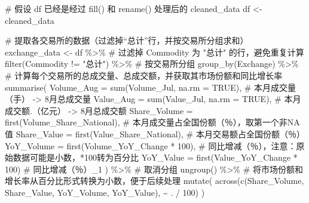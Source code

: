 \documentclass[
  letterpaper,
  DIV=11,
  numbers=noendperiod]{scrartcl}
\newenvironment{Shaded}{\begin{snugshade}}{\end{snugshade}}
\newcommand{\AttributeTok}[1]{\textcolor[rgb]{0.40,0.45,0.13}{#1}}
\newcommand{\CommentTok}[1]{\textcolor[rgb]{0.37,0.37,0.37}{#1}}
\newcommand{\ConstantTok}[1]{\textcolor[rgb]{0.56,0.35,0.01}{#1}}
\newcommand{\DecValTok}[1]{\textcolor[rgb]{0.68,0.00,0.00}{#1}}
\newcommand{\FunctionTok}[1]{\textcolor[rgb]{0.28,0.35,0.67}{#1}}
\newcommand{\NormalTok}[1]{\textcolor[rgb]{0.00,0.23,0.31}{#1}}
\newcommand{\OtherTok}[1]{\textcolor[rgb]{0.00,0.23,0.31}{#1}}
\newcommand{\SpecialCharTok}[1]{\textcolor[rgb]{0.37,0.37,0.37}{#1}}
\newcommand{\StringTok}[1]{\textcolor[rgb]{0.13,0.47,0.30}{#1}}
\begin{document}
\begin{Shaded}
\begin{Highlighting}[]
\CommentTok{\# 假设 df 已经是经过 fill() 和 rename() 处理后的 cleaned\_data}
\NormalTok{df }\OtherTok{\textless{}{-}}\NormalTok{ cleaned\_data}

\CommentTok{\# 提取各交易所的数据（过滤掉“总计”行，并按交易所分组求和）}
\NormalTok{exchange\_data }\OtherTok{\textless{}{-}}\NormalTok{ df }\SpecialCharTok{\%\textgreater{}\%}
  \CommentTok{\# 过滤掉 Commodity 为 "总计" 的行，避免重复计算}
  \FunctionTok{filter}\NormalTok{(Commodity }\SpecialCharTok{!=} \StringTok{"总计"}\NormalTok{) }\SpecialCharTok{\%\textgreater{}\%}
  \CommentTok{\# 按交易所分组}
  \FunctionTok{group\_by}\NormalTok{(Exchange) }\SpecialCharTok{\%\textgreater{}\%}
  \CommentTok{\# 计算每个交易所的总成交量、总成交额，并获取其市场份额和同比增长率}
  \FunctionTok{summarise}\NormalTok{(}
    \AttributeTok{Volume\_Aug =} \FunctionTok{sum}\NormalTok{(Volume\_Jul, }\AttributeTok{na.rm =} \ConstantTok{TRUE}\NormalTok{),           }\CommentTok{\# 本月成交量（手） {-}\textgreater{} 8月总成交量}
    \AttributeTok{Value\_Aug =} \FunctionTok{sum}\NormalTok{(Value\_Jul, }\AttributeTok{na.rm =} \ConstantTok{TRUE}\NormalTok{),             }\CommentTok{\# 本月成交额.（亿元） {-}\textgreater{} 8月总成交额}
    \AttributeTok{Share\_Volume =} \FunctionTok{first}\NormalTok{(Volume\_Share\_National),          }\CommentTok{\# 本月成交量占全国份额（％），取第一个非NA值}
    \AttributeTok{Share\_Value =} \FunctionTok{first}\NormalTok{(Value\_Share\_National),            }\CommentTok{\# 本月交易额占全国份额（％）}
    \AttributeTok{YoY\_Volume =} \FunctionTok{first}\NormalTok{(Volume\_YoY\_Change }\SpecialCharTok{*} \DecValTok{100}\NormalTok{),          }\CommentTok{\# 同比增减（％），注意：原始数据可能是小数，*100转为百分比}
    \AttributeTok{YoY\_Value =} \FunctionTok{first}\NormalTok{(Value\_YoY\_Change }\SpecialCharTok{*} \DecValTok{100}\NormalTok{)             }\CommentTok{\# 同比增减（％）\_1}
\NormalTok{  ) }\SpecialCharTok{\%\textgreater{}\%}
  \CommentTok{\# 取消分组}
  \FunctionTok{ungroup}\NormalTok{() }\SpecialCharTok{\%\textgreater{}\%}
  \CommentTok{\# 将市场份额和增长率从百分比形式转换为小数，便于后续处理}
  \FunctionTok{mutate}\NormalTok{(}
    \FunctionTok{across}\NormalTok{(}\FunctionTok{c}\NormalTok{(Share\_Volume, Share\_Value, YoY\_Volume, YoY\_Value), }\SpecialCharTok{\textasciitilde{}}\NormalTok{ . }\SpecialCharTok{/} \DecValTok{100}\NormalTok{)}
\NormalTok{  )}


\end{Highlighting}
\end{Shaded}
\end{document}
